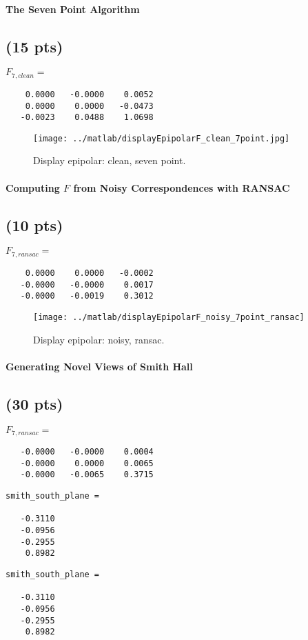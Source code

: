 \documentclass[12pt]{article}
\newcounter{list}
\begin{document}
\paragraph{The Seven Point Algorithm}

\subsection{(15 pts)}
$F_{7,clean}=$
\begin{verbatim}
    0.0000   -0.0000    0.0052
    0.0000    0.0000   -0.0473
   -0.0023    0.0488    1.0698
\end{verbatim}

\begin{figure}[htbp]
\centering \texttt{[image: ../matlab/displayEpipolarF\_clean\_7point.jpg]}
\caption{Display epipolar: clean, seven point.}
\end{figure}



\paragraph{Computing $F$ from Noisy Correspondences with RANSAC}

\subsection{(10 pts)}
$F_{7,ransac}=$
\begin{verbatim}
    0.0000    0.0000   -0.0002
   -0.0000   -0.0000    0.0017
   -0.0000   -0.0019    0.3012
\end{verbatim}

\begin{figure}[htbp]
\centering \texttt{[image: ../matlab/displayEpipolarF\_noisy\_7point\_ransac]}
\caption{Display epipolar: noisy, ransac.}
\end{figure}



\paragraph{Generating Novel Views of Smith Hall}

\subsection{(30 pts)}
$F_{7,ransac}=$
\begin{verbatim}
   -0.0000   -0.0000    0.0004
   -0.0000    0.0000    0.0065
   -0.0000   -0.0065    0.3715
\end{verbatim}
\begin{verbatim}
smith_south_plane =

   -0.3110
   -0.0956
   -0.2955
    0.8982
\end{verbatim}
\begin{verbatim}
smith_south_plane =

   -0.3110
   -0.0956
   -0.2955
    0.8982
\end{verbatim}
\end{document}
